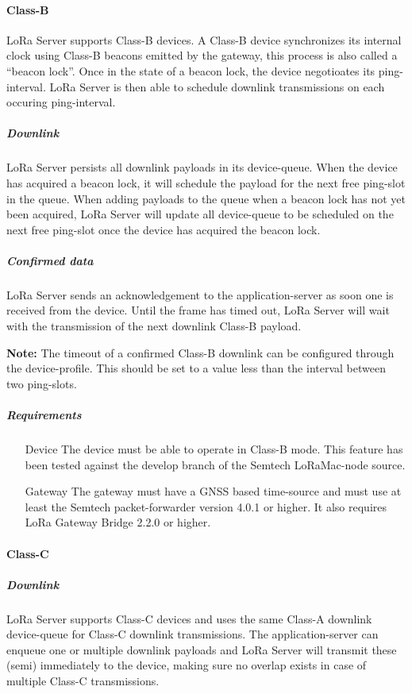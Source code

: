 \paragraph{Class-B}
LoRa Server supports Class-B devices.
A Class-B device synchronizes its internal clock using Class-B beacons emitted by the gateway,
	this process is also called a “beacon lock”.
Once in the state of a beacon lock,
	the device negotioates its ping-interval.
LoRa Server is then able to schedule downlink transmissions on each occuring ping-interval.

\subparagraph{Downlink}
LoRa Server persists all downlink payloads in its device-queue.
When the device has acquired a beacon lock,
	it will schedule the payload for the next free ping-slot in the queue.
When adding payloads to the queue when a beacon lock has not yet been acquired,
	LoRa Server will update all device-queue to be scheduled on the next free ping-slot once the device has acquired the beacon lock.

\subparagraph{Confirmed data}
LoRa Server sends an acknowledgement to the application-server as soon one is received from the device.
Until the frame has timed out,
	LoRa Server will wait with the transmission of the next downlink Class-B payload.

\textbf{Note:} The timeout of a confirmed Class-B downlink can be configured through the device-profile.
This should be set to a value less than the interval between two ping-slots.

\subparagraph{Requirements}

\begin{itemize}
	\item[Device]
	The device must be able to operate in Class-B mode.
This feature has been tested against the develop branch of the Semtech LoRaMac-node source.
	\item[Gateway]
	The gateway must have a GNSS based time-source and must use at least the Semtech packet-forwarder version 4.0.1 or higher.
It also requires LoRa Gateway Bridge 2.2.0 or higher.

\end{itemize}


\paragraph{Class-C}

\subparagraph{Downlink}
LoRa Server supports Class-C devices and uses the same Class-A downlink device-queue for Class-C downlink transmissions.
The application-server can enqueue one or multiple downlink payloads and LoRa Server will transmit these (semi) immediately to the device,
	making sure no overlap exists in case of multiple Class-C transmissions.

